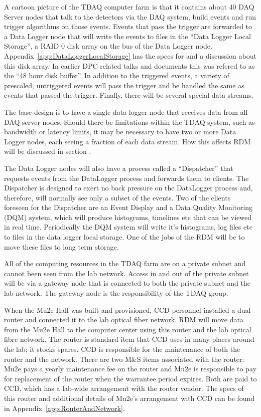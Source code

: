 A cartoon picture of the TDAQ computer farm is that it contains about 40 DAQ Server nodes
that talk to the detectors via the  DAQ system, build events and run trigger algorithms on those events.
Events that pass the trigger are forwarded to a Data Logger node that will write the events
to files in the ``Data Logger Local Storage'', a RAID 0 disk array on the bus of the Data Logger node.
Appendix~\ref{app:DataLoggerLocalStorage} has the specs for and a discussion about this disk array.
In earlier DPC related talks and documents this was refered to as the ``48 hour disk buffer''.
In addition to the triggered events, a variety of prescaled, untriggered events will pass the
trigger and be handled the same as events that passed the trigger.
Finally, there will be several special data streams.

The base design is to have a single data logger node that receives data from all DAQ server nodes.
Should there be limitations within the TDAQ system, such as bandwidth or latency limits,
it may be necessary to have two or more Data Logger nodes, each seeing a fraction of each data stream.
How this affects RDM will be discussed in section .

The Data Logger nodes will also have a process called a ``Dispatcher''
that requests events from the DataLogger process
and forwards them to clients.
The Dispatcher is designed to exert no back pressure on the DataLogger process
and, therefore, will normally see only a subset of the events.
Two of the clients foreseen for the Dispatcher are an Event Display and
a Data Quality Monitoring (DQM) system,
which will produce histograms, timelines etc that can be viewed in real time.
Periodically the DQM system will write it's histograms, log files etc to
files in the data logger local storage.  One of the jobs of the RDM will be
to move these files to long term storage.

All of the computing resources in the TDAQ farm are on a private subnet
and cannot been seen from the lab network.  Access in and out
of the private subnet will be via a gateway node that is connected to
both the private subnet and the lab network.  The gateway node is the responsibility
of the TDAQ group.

When the Mu2e Hall was built and provisioned, CCD personnel installed a dual router
and connected it to the lab optical fiber network.
RDM will move data from the Mu2e Hall
to the computer center using this router and the lab optical fibre network.
The router is standard item that CCD uses in many places around the lab; it stocks spares.
CCD is responsible for the maintenance of both the router and the network.
There are two M\&S items associated with the router: Mu2e pays a yearly
maintenance fee on the router and Mu2e is responsible to pay for replacement
of the router when the warrantee period expires.  Both are paid to CCD,
which has a lab-wide arrangement with the router vendor.
The specs of this router and additional details of Mu2e's arrangement with CCD
can be found in Appendix~\ref{app:RouterAndNetwork}.

